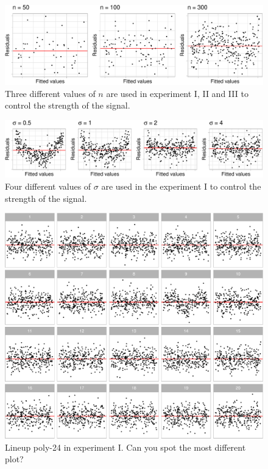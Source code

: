\documentclass[]{interact}
\theoremstyle{plain}%
\theoremstyle{definition}
\theoremstyle{remark}
\begin{document}
\begin{figure}

{\centering \includegraphics[width=1\linewidth]{paper_comparison_files/figure-latex/different-n-1} 

}

\caption{Three different values of $n$ are used in experiment I, II and III to control the strength of the signal.}\label{fig:different-n}
\end{figure}

\begin{figure}

{\centering \includegraphics[width=1\linewidth]{paper_comparison_files/figure-latex/different-sigma-1} 

}

\caption{Four different values of $\sigma$ are used in the experiment I to control the strength of the signal.}\label{fig:different-sigma}
\end{figure}

\begin{figure}

{\centering \includegraphics[width=1\linewidth]{paper_comparison_files/figure-latex/example-poly-lineup-1} 

}

\caption{Lineup poly-24 in experiment I. Can you spot the most different plot? \label{fig:example-poly-lineup}}\label{fig:example-poly-lineup}
\end{figure}
\end{document}
